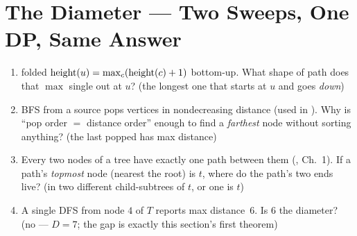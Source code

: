 \section{The Diameter --- Two Sweeps, One DP, Same Answer}\label{sec:c09-diameter}

\begin{previouslybox}
\begin{enumerate}[nosep, leftmargin=1.6em]
  \item {} folded $\operatorname{height}(u)=\max_c(\operatorname{height}(c)+1)$ bottom-up. What
        shape of path does that $\max$ single out at $u$? (the longest one that starts at
        $u$ and goes \emph{down})
  \item BFS from a source pops vertices in nondecreasing distance (used in
        ). Why is ``pop order $=$ distance order'' enough to find a
        \emph{farthest} node without sorting anything? (the last popped has max distance)
  \item Every two nodes of a tree have exactly one path between them (,
        Ch.~1). If a path's \emph{topmost} node (nearest the root) is $t$, where do the
        path's two ends live? (in two different child-subtrees of $t$, or one is $t$)
  \item A single DFS from node $4$ of $T$ reports max distance~$6$. Is $6$ the diameter?
        (no --- $D=7$; the gap is exactly this section's first theorem)
\end{enumerate}
\end{previouslybox}

